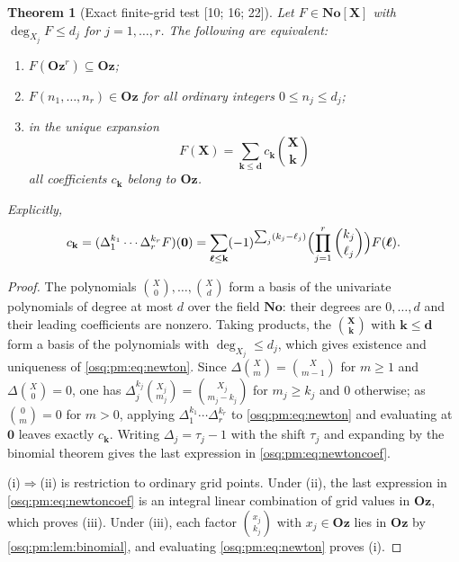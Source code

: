 \documentclass[11pt,letterpaper]{article}
\numberwithin{equation}{section}
\newtheorem{theorem}{Theorem}[section]
\theoremstyle{definition}
\theoremstyle{remark}
\theoremstyle{plain}
\newcommand{\No}{\mathbf{No}}
\newcommand{\Oz}{\mathbf{Oz}}
\newcommand{\src}[1]{\textup{\textsf{[#1]}}}
\begin{document}
\begin{theorem}[Exact finite-grid test \src{10; 16; 22}]\label{osq:pm:thm:grid}
Let $F\in\No[\mathbf X]$ with $\deg_{X_j}F\le d_j$ for $j=1,\dots,r$. The following are
equivalent:
\begin{enumerate}
 \item $F(\Oz^r)\subseteq\Oz$;
 \item $F(n_1,\dots,n_r)\in\Oz$ for all ordinary integers $0\le n_j\le d_j$;
 \item in the unique expansion
 \begin{equation}\label{osq:pm:eq:newton}
  F(\mathbf X)=\sum_{\mathbf k\le\mathbf d}c_{\mathbf k}\binom{\mathbf X}{\mathbf k}
 \end{equation}
 all coefficients $c_{\mathbf k}$ belong to $\Oz$.
\end{enumerate}
Explicitly,
\begin{equation}\label{osq:pm:eq:newtoncoef}
 c_{\mathbf k}=(\Delta_1^{k_1}\cdots\Delta_r^{k_r}F)(\mathbf 0)
 =\sum_{\boldsymbol\ell\le\mathbf k}
   (-1)^{\sum_j(k_j-\ell_j)}
   \Bigl(\prod_{j=1}^r\binom{k_j}{\ell_j}\Bigr)F(\boldsymbol\ell).
\end{equation}
\end{theorem}
\begin{proof}
The polynomials $\binom X0,\dots,\binom Xd$ form a basis of the univariate polynomials of
degree at most $d$ over the field $\No$: their degrees are $0,\dots,d$ and their leading
coefficients are nonzero. Taking products, the $\binom{\mathbf X}{\mathbf k}$ with
$\mathbf k\le\mathbf d$ form a basis of the polynomials with $\deg_{X_j}\le d_j$, which
gives existence and uniqueness of \eqref{osq:pm:eq:newton}. Since
$\Delta\binom Xm=\binom X{m-1}$ for $m\ge1$ and $\Delta\binom X0=0$, one has
$\Delta_j^{k_j}\binom{X_j}{m_j}=\binom{X_j}{m_j-k_j}$ for $m_j\ge k_j$ and $0$ otherwise;
as $\binom 0m=0$ for $m>0$, applying $\Delta_1^{k_1}\cdots\Delta_r^{k_r}$ to
\eqref{osq:pm:eq:newton} and evaluating at $\mathbf 0$ leaves exactly $c_{\mathbf k}$.
Writing $\Delta_j=\tau_j-1$ with the shift $\tau_j$ and expanding by the binomial theorem
gives the last expression in \eqref{osq:pm:eq:newtoncoef}.

(i)$\Rightarrow$(ii) is restriction to ordinary grid points. Under (ii), the last
expression in \eqref{osq:pm:eq:newtoncoef} is an integral linear combination of grid values
in $\Oz$, which proves (iii). Under (iii), each factor $\binom{x_j}{k_j}$ with $x_j\in\Oz$
lies in $\Oz$ by \cref{osq:pm:lem:binomial}, and evaluating \eqref{osq:pm:eq:newton}
proves (i).
\end{proof}
\end{document}
